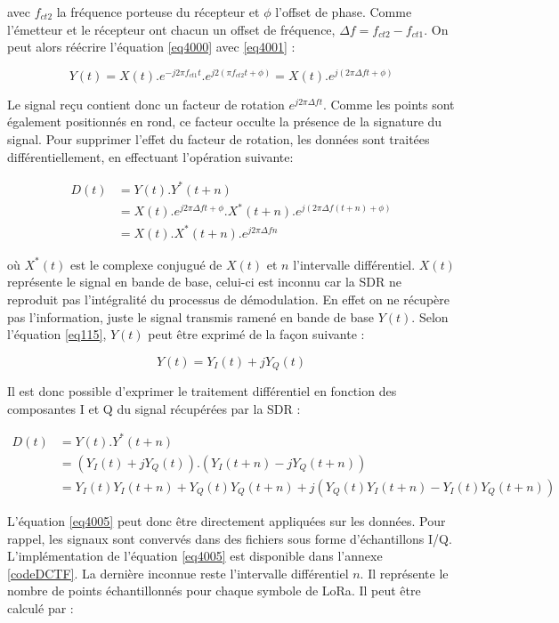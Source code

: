 avec $f_{ct2}$ la fréquence porteuse du récepteur et $\phi$ l'offset de phase. Comme l'émetteur et le récepteur ont chacun un offset de fréquence, $\Delta f = f_{ct2} - f_{ct1}$. On peut alors réécrire l'équation \ref{eq4000} avec \ref{eq4001} :

\begin{equation}\label{eq4002}
	Y(t) = X(t) . e^{-j2\pi f_{ct1} t} . e^{j2(\pi f_{ct2} t+ \phi)} = X(t) . e^{j(2\pi \Delta f t + \phi)}
\end{equation} 

Le signal reçu contient donc un facteur de rotation $e^{j2\pi \Delta f t}$. Comme les points sont également positionnés en rond, ce facteur occulte la présence de la signature du signal.
Pour supprimer l'effet du facteur de rotation, les données sont traitées différentiellement, en effectuant l'opération suivante:

\begin{align}\label{eq4003}
	D(t) &= Y(t) . Y^{*}(t+n) \\
		 &= X(t) . e^{j2\pi \Delta f t+ \phi} .X^{*}(t+n) . e^{j(2\pi \Delta f (t + n) + \phi)} \nonumber \\
 		 &= X(t) . X^{*}(t+n) . e^{j2\pi \Delta f n}
\end{align}

où $X^{*}(t)$ est le complexe conjugué de $X(t)$ et $n$ l'intervalle différentiel. $X(t)$ représente le signal en bande de base, celui-ci est inconnu car la \ac{SDR} ne reproduit pas l'intégralité du processus de démodulation. En effet on ne récupère pas l'information, juste le signal transmis ramené en bande de base $Y(t)$. Selon l'équation \ref{eq115}, $Y(t)$ peut être exprimé de la façon suivante : 

\begin{equation}\label{eq4004}
	Y(t) = Y_I(t) + jY_Q(t)
\end{equation} 

Il est donc possible d'exprimer le traitement différentiel en fonction des composantes I et Q du signal récupérées par la \ac{SDR} :

\begin{align}\label{eq4005}
	D(t) &= Y(t) . Y^{*}(t+n) \nonumber \\
		 &= (Y_I(t) + jY_Q(t)) . (Y_I(t+n) - jY_Q(t+n)) \nonumber \\
 		 &= Y_I(t)Y_I(t+n) + Y_Q(t)Y_Q(t+n) + j(Y_Q(t)Y_I(t+n) - Y_I(t)Y_Q(t+n))
\end{align}

L'équation \ref{eq4005} peut donc être directement appliquées sur les données. Pour rappel, les signaux sont convervés dans des fichiers sous forme d'échantillons \ac{I/Q}. L'implémentation de l'équation \ref{eq4005} est disponible dans l'annexe \ref{codeDCTF}. La dernière inconnue reste l'intervalle différentiel $n$. Il représente le nombre de points échantillonnés pour chaque symbole de \ac{LoRa}. Il peut être calculé par :

